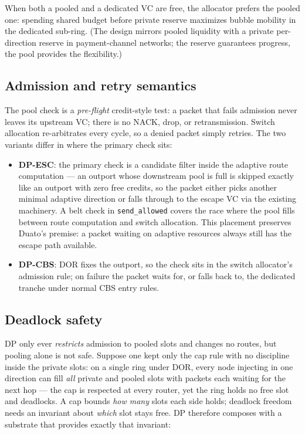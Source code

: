 \documentclass[10pt]{article}
\begin{document}
When both a pooled and a dedicated VC are free, the allocator prefers the
pooled one: spending shared budget before private reserve maximizes
bubble mobility in the dedicated sub-ring. (The design mirrors pooled
liquidity with a private per-direction reserve in payment-channel
networks; the reserve guarantees progress, the pool provides the
flexibility.)

\subsection{Admission and retry semantics}
\label{sec:retry}

The pool check is a \emph{pre-flight} credit-style test: a packet that
fails admission never leaves its upstream VC; there is no NACK, drop, or
retransmission. Switch allocation re-arbitrates every cycle, so a denied
packet simply retries. The two variants differ in where the primary
check sits:

\begin{itemize}
  \item \textbf{DP-ESC}: the primary check is a candidate filter inside
    the adaptive route computation --- an outport whose downstream pool is
    full is skipped exactly like an outport with zero free credits, so
    the packet either picks another minimal adaptive direction or falls
    through to the escape VC via the existing machinery. A belt check in
    \texttt{send\_allowed} covers the race where the pool fills between
    route computation and switch allocation. This placement preserves
    Duato's premise: a packet waiting on adaptive resources always still
    has the escape path available.
  \item \textbf{DP-CBS}: DOR fixes the outport, so the check sits in the
    switch allocator's admission rule; on failure the packet waits for,
    or falls back to, the dedicated tranche under normal CBS entry rules.
\end{itemize}

\subsection{Deadlock safety}
\label{sec:safety}

DP only ever \emph{restricts} admission to pooled slots and changes no
routes, but pooling alone is not safe. Suppose one kept only the cap rule
with no discipline inside the private slots: on a single ring under DOR,
every node injecting in one direction can fill \emph{all} private and
pooled slots with packets each waiting for the next hop --- the cap is
respected at every router, yet the ring holds no free slot and deadlocks.
A cap bounds \emph{how many} slots each side holds; deadlock freedom
needs an invariant about \emph{which} slot stays free. DP therefore
composes with a substrate that provides exactly that invariant:
\end{document}
